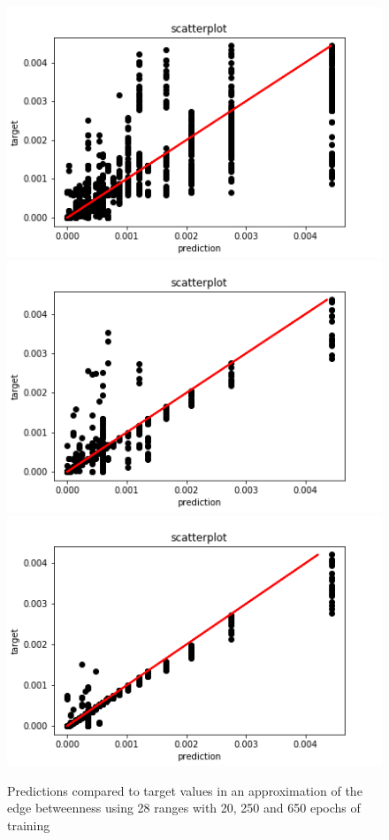 \begin{figure}[H]
%
  \centering
    \includegraphics[width=0.9\linewidth]{img/GN_exp1/28bins/scatter_plot_20epochs.png}
\endminipage
{}%
  \centering
    \includegraphics[width=0.9\linewidth]{img/GN_exp1/28bins/scatter_plot_250epochs.png}
\endminipage
{}%
  \centering
    \includegraphics[width=0.9\linewidth]{img/GN_exp1/28bins/scatter_plot_600epochs.png}
\endminipage
\caption{Predictions compared to target values in an approximation of the edge betweenness using 28 ranges with 20, 250 and 650 epochs of training}\label{fig:edgeb_exp1_20bins}
\end{figure}




